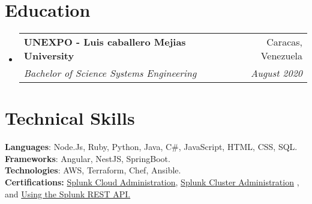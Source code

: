 \documentclass[letterpaper,11pt]{article}
\makeatletter
\newcommand{\resumeSubheading}[4]{
  \vspace{-2pt}\item
    \begin{tabular*}{0.97\textwidth}[t]{l@{\extracolsep{\fill}}r}
      \textbf{#1} & #2 \\
      \textit{\small#3} & \textit{\small #4} \\
    \end{tabular*}\vspace{-7pt}
}
\newcommand{\resumeSubHeadingListStart}{\begin{itemize}[leftmargin=0.15in, label={}]}
\newcommand{\resumeSubHeadingListEnd}{\end{itemize}}
\makeatother
\begin{document}
%
\section{Education}
  \resumeSubHeadingListStart
    \resumeSubheading
      {UNEXPO - Luis caballero Mejias University}{Caracas, Venezuela}
      {Bachelor of Science Systems Engineering}{August 2020}
  \resumeSubHeadingListEnd

\section{Technical Skills}
 \begin{itemize}[leftmargin=0.15in, label={}]
    \small{\item{
     \textbf{Languages}{: Node.Js, Ruby, Python, Java, C\#, JavaScript, HTML, CSS, SQL.} \\
     \textbf{Frameworks}{: Angular, NestJS, SpringBoot. } \\
     \textbf{Technologies}{: AWS, Terraform, Chef, Ansible. }  \\
     \textbf{Certifications:}{ \href{https://www.credly.com/badges/43b10234-742d-44fc-8052-a21e5bfabc13/linked_in_profile}{Splunk Cloud Administration}, 
     \href{https://www.credly.com/badges/782d7907-5cf9-49ac-93d0-72e30cc4947e/linked_in_profile}{Splunk Cluster Administration} , and 
     \href{https://www.credly.com/badges/39ba9c1d-1279-4a77-a183-28c1bcb6ec7a/linked_in_profile}{Using the Splunk REST API.}} }}
 \end{itemize}


\end{document}
